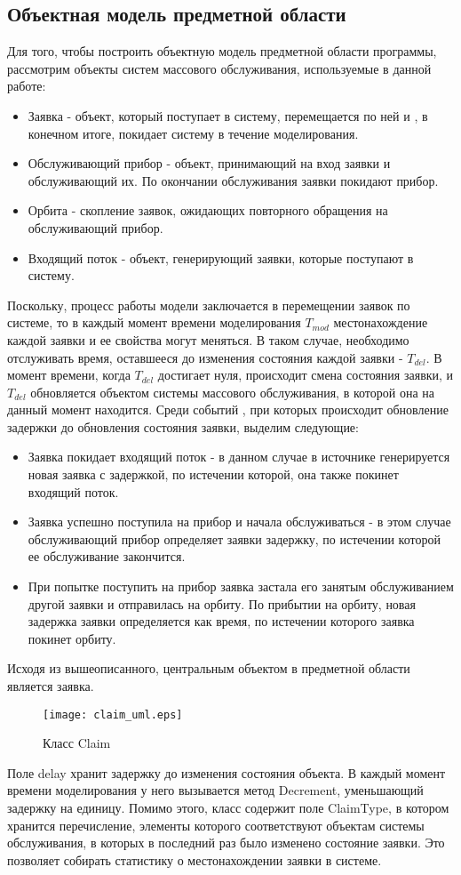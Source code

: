 \subsection {Объектная модель предметной области}
Для того, чтобы построить объектную модель предметной области программы, рассмотрим  объекты систем массового обслуживания, используемые в данной работе:
\begin{itemize}
\item Заявка - объект, который поступает в систему, перемещается по ней и , в конечном итоге, покидает систему в течение моделирования.
\item Обслуживающий прибор - объект, принимающий на вход заявки и обслуживающий их. По окончании обслуживания заявки покидают прибор.
\item Орбита - скопление заявок, ожидающих повторного обращения на обслуживающий прибор.
\item Входящий поток - объект, генерирующий заявки, которые поступают в систему.
	\end{itemize}
 Поскольку, процесс работы модели заключается в перемещении заявок по системе, то в каждый момент времени моделирования $T_{mod}$ местонахождение каждой заявки и ее свойства могут меняться. В таком случае, необходимо отслуживать время, оставшееся до изменения состояния каждой заявки - $T_{del}$. В момент времени, когда $T_{del}$ достигает нуля,  происходит смена состояния заявки, и  $T_{del}$ обновляется объектом системы массового обслуживания, в которой она на данный момент находится. Среди событий , при которых происходит обновление задержки до обновления состояния заявки, выделим следующие:
\begin{itemize}
	\item Заявка покидает входящий поток - в данном случае в источнике генерируется новая заявка с задержкой, по истечении которой, она также покинет входящий поток.
	\item Заявка успешно поступила на прибор и начала обслуживаться - в этом случае обслуживающий прибор определяет заявки задержку, по истечении которой ее обслуживание закончится.
	\item При попытке поступить на прибор заявка застала его занятым обслуживанием другой заявки и отправилась на орбиту. По прибытии на орбиту, новая задержка заявки определяется как время, по истечении которого заявка покинет орбиту.
\end{itemize}
Исходя из вышеописанного, центральным объектом в предметной области является заявка.
\begin{figure}[H]
	\centering
	\texttt{[image: claim\_uml.eps]}
	\caption{Класс Claim}
	\label{claim_uml}
\end{figure}
Поле delay хранит задержку до изменения состояния объекта. В каждый момент времени моделирования у него вызывается метод Decrement, уменьшающий задержку на единицу. Помимо этого, класс содержит поле ClaimType, в котором хранится перечисление, элементы которого соответствуют объектам системы обслуживания, в которых в последний раз было изменено состояние заявки. Это позволяет собирать статистику о местонахождении заявки в системе.

